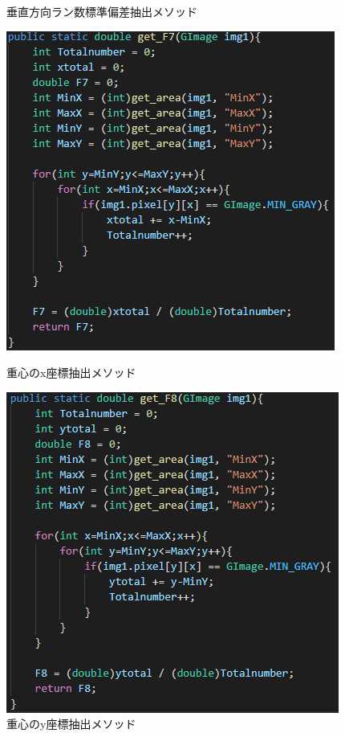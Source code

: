\begin{enumerate}
\begin{itemize}
\begin{itemize}
\begin{figure}[htbp]
\begin{minipage}[t]{0.45\hsize}
          \centering
          \caption{垂直方向ラン数標準偏差抽出メソッド}
          \label{graph:10}
        \end{minipage}
        \begin{minipage}[t]{0.45\hsize}
          \includegraphics[scale=0.4]{重心のx座標抽出1.PNG}
          \centering
          \caption{重心のx座標抽出メソッド}
          \label{graph:11}
        \end{minipage}
        \begin{minipage}[t]{0.45\hsize}
          \includegraphics[scale=0.4]{重心のy座標抽出1.PNG}
          \centering
          \caption{重心のy座標抽出メソッド}
          \label{graph:12}
        \end{minipage}
      \end{figure}
    \end{itemize}
  \end{itemize}
  \clearpage


\end{enumerate}
